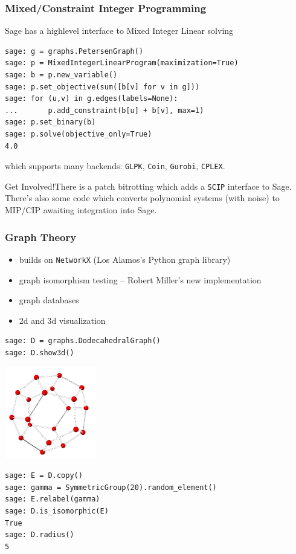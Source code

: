 \documentclass[10pt]{beamer}
\newcommand{\getinvolved}[1]{\begin{block}{Get Involved!}#1\end{block}}
\begin{document}
\begin{frame}
\frametitle{Mixed/Constraint Integer Programming}

Sage has a highlevel interface to Mixed Integer Linear solving

\begin{lstlisting}
sage: g = graphs.PetersenGraph()
sage: p = MixedIntegerLinearProgram(maximization=True)
sage: b = p.new_variable()
sage: p.set_objective(sum([b[v] for v in g]))
sage: for (u,v) in g.edges(labels=None):
...       p.add_constraint(b[u] + b[v], max=1)
sage: p.set_binary(b)
sage: p.solve(objective_only=True)
4.0
\end{lstlisting}


which supports many backends: {\tt GLPK}, {\tt Coin}, {\tt Gurobi}, {\tt CPLEX}.

\getinvolved{There is a patch bitrotting which adds a {\tt SCIP} interface to Sage. There's also some code which converts polynomial systems (with noise) to MIP/CIP awaiting integration into Sage.}

\end{frame}

\begin{frame}[fragile]
\frametitle{Graph Theory}
\begin{itemize}
\item builds on {\tt NetworkX} (Los Alamos's Python graph library)
\item graph isomorphism testing -- Robert Miller's new implementation
\item graph databases
\item 2d and 3d visualization
\end{itemize}
\begin{lstlisting}
sage: D = graphs.DodecahedralGraph()
sage: D.show3d()
\end{lstlisting}
\vspace{-5em}
\begin{flushright}
\includegraphics[width=0.3\textwidth]{graph3d.jpeg}
\end{flushright}
\vspace{-6em}
\begin{lstlisting}
sage: E = D.copy()
sage: gamma = SymmetricGroup(20).random_element()
sage: E.relabel(gamma)
sage: D.is_isomorphic(E)
True
sage: D.radius()
5
\end{lstlisting}
\end{frame}
\end{document}
